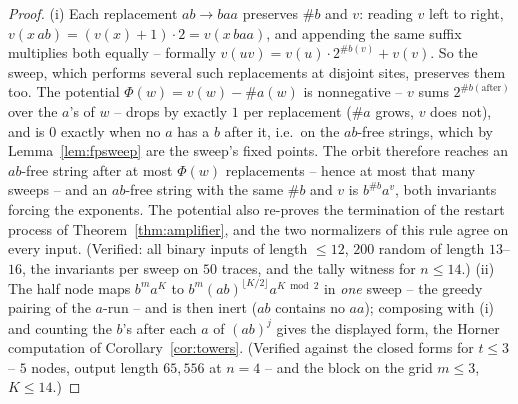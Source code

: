 \begin{proof}
    (i) Each replacement $ab \to baa$ preserves $\#b$ and $v$:
    reading $v$ left to right, $v(x\,ab) = (v(x)+1) \cdot 2 =
    v(x\,baa)$, and appending the same suffix multiplies both equally
    -- formally $v(uv) = v(u) \cdot 2^{\#b(v)} + v(v)$. So the sweep,
    which performs several such replacements at disjoint sites,
    preserves them too. The potential $\Phi(w) = v(w) - \#a(w)$ is
    nonnegative -- $v$ sums $2^{\#b(\text{after})}$ over the $a$'s of
    $w$ -- drops by exactly $1$ per replacement ($\#a$ grows, $v$
    does not), and is $0$ exactly when no $a$ has a $b$ after it, i.e.\
    on the $ab$-free strings, which by Lemma~\ref{lem:fpsweep} are the
    sweep's fixed points. The orbit therefore reaches an $ab$-free
    string after at most $\Phi(w)$ replacements -- hence at most that
    many sweeps -- and an $ab$-free string with the same $\#b$ and $v$
    is $b^{\#b} a^{v}$, both invariants forcing the exponents. The
    potential also re-proves the termination of the restart process of
    Theorem~\ref{thm:amplifier}, and the two normalizers of this rule
    agree on every input. (Verified: all binary inputs of length
    $\leq 12$, $200$ random of length $13$--$16$, the invariants per
    sweep on $50$ traces, and the tally witness for $n \leq 14$.)
    (ii) The half node maps $b^{m} a^{K}$ to
    $b^{m} (ab)^{\lfloor K/2 \rfloor} a^{K \bmod 2}$ in \emph{one}
    sweep -- the greedy pairing of the $a$-run -- and is then inert
    ($ab$ contains no $aa$); composing with (i) and counting the
    $b$'s after each $a$ of $(ab)^{j}$ gives the displayed form, the
    Horner computation of Corollary~\ref{cor:towers}. (Verified
    against the closed forms for $t \leq 3$ -- $5$ nodes, output
    length $65{,}556$ at $n = 4$ -- and the block on the grid
    $m \leq 3$, $K \leq 14$.)
\end{proof}

